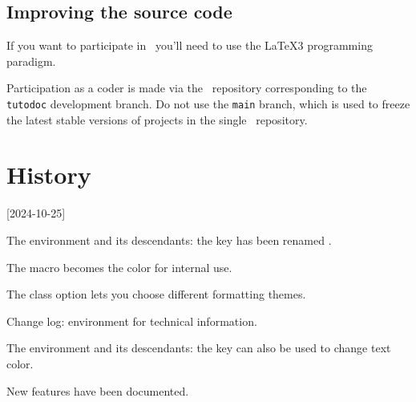 
\subsection{Improving the source code}

\begin{tdocimp}
    If you want to participate in \thisproj\, you'll need to use the \LaTeX3 programming paradigm.
\end{tdocimp}


Participation as a coder is made via the \thisrepo\ repository corresponding to the \verb#tutodoc# development branch.
Do not use the \verb#main# branch, which is used to freeze the latest stable versions of projects in the single \thismonorepo\ repository.


\section{History}

\small

[2024-10-25]

\small

\begin{tdocbreak}
    \item The  environment and its descendants: the  key has been renamed .

    \item The macro  becomes the color  for internal use.
\end{tdocbreak}


\begin{tdocnew}
    \item The  class option lets you choose different formatting themes.

	\item Change log:  environment for technical information.
	
    \item The  environment and its descendants: the  key can also be used to change text color.

    \item New features have been documented.
\end{tdocnew}


